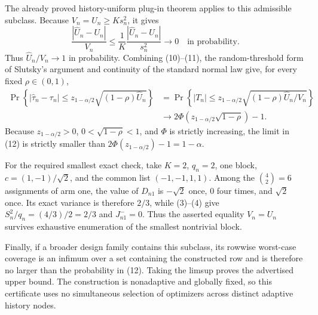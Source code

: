 The already proved history-uniform plug-in theorem applies to this admissible subclass. Because \(V_n=U_n\ge Ks_n^2\), it gives
\[
\frac{|\widehat U_n-U_n|}{V_n}
\le\frac1K\frac{|\widehat U_n-U_n|}{s_n^2}
\longrightarrow0
\quad\text{in probability}.
\tag{11}
\]
Thus \(\widehat U_n/V_n\to1\) in probability. Combining (10)--(11), the random-threshold form of Slutsky's argument and continuity of the standard normal law give, for every fixed \(\rho\in(0,1)\),
\[
\begin{aligned}
\Pr\!\left\{|\widehat\tau_n-\tau_n|
\le z_{1-\alpha/2}\sqrt{(1-\rho)\widehat U_n}\right\}
&=\Pr\!\left\{|T_n|
\le z_{1-\alpha/2}\sqrt{(1-\rho)\widehat U_n/V_n}\right\}\\
&\longrightarrow
2\Phi\!\left(z_{1-\alpha/2}\sqrt{1-\rho}\right)-1.
\end{aligned}
\tag{12}
\]
Because \(z_{1-\alpha/2}>0\), \(0<\sqrt{1-\rho}<1\), and \(\Phi\) is strictly increasing, the limit in (12) is strictly smaller than
\(2\Phi(z_{1-\alpha/2})-1=1-\alpha\).

For the required smallest exact check, take \(K=2\), \(q_n=2\), one block, \(c=(1,-1)/\sqrt2\), and the common list \((-1,-1,1,1)\). Among the \(\binom42=6\) assignments of arm one, the value of \(D_{n1}\) is \(-\sqrt2\) once, \(0\) four times, and \(\sqrt2\) once. Its exact variance is therefore \(2/3\), while (3)--(4) give \(S_n^2/q_n=(4/3)/2=2/3\) and \(J_{n1}^{-}=0\). Thus the asserted equality \(V_n=U_n\) survives exhaustive enumeration of the smallest nontrivial block.

Finally, if a broader design family contains this subclass, its rowwise worst-case coverage is an infimum over a set containing the constructed row and is therefore no larger than the probability in (12). Taking the limsup proves the advertised upper bound. The construction is nonadaptive and globally fixed, so this certificate uses no simultaneous selection of optimizers across distinct adaptive history nodes.